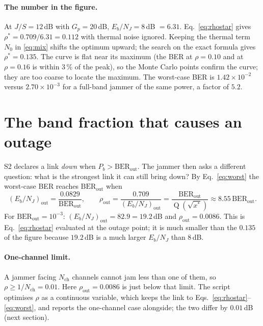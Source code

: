 \documentclass[11pt,a4paper]{article}
\newcommand{\Q}{\operatorname{Q}}
\newcommand{\EbNJ}{E_b/N_J}
\begin{document}
\paragraph{The number in the figure.}
At $J/S = 12$\,dB with $G_p=20$\,dB, $\EbNJ = 8$\,dB $=6.31$. Eq.~\eqref{eq:rhostar}
gives $\rho^\ast = 0.709/6.31 = 0.112$ with thermal noise ignored. Keeping the
thermal term $N_0$ in \eqref{eq:mix} shifts the optimum upward; the search on
the exact formula gives $\rho^\ast = 0.135$. The curve is flat near its maximum
(the BER at $\rho=0.10$ and at $\rho=0.16$ is within 3\,\% of the peak), so the
Monte Carlo points confirm the curve; they are too coarse to locate the
maximum. The worst-case BER is
$1.42\times10^{-2}$ versus $2.70\times10^{-3}$ for a full-band jammer of the same
power, a factor of $5.2$.

\section{The band fraction that causes an outage}

S2 declares a link \emph{down} when $P_b > \mathrm{BER}_{\mathrm{out}}$. The
jammer then asks a different question: what is the strongest link it can
still bring down? By
Eq.~\eqref{eq:worst} the worst-case BER reaches $\mathrm{BER}_{\mathrm{out}}$ when
\begin{equation}
  \left(\EbNJ\right)_{\mathrm{out}} = \frac{0.0829}{\mathrm{BER}_{\mathrm{out}}},
  \qquad
  \rho_{\mathrm{out}} = \frac{0.709}{(\EbNJ)_{\mathrm{out}}}
  = \frac{\mathrm{BER}_{\mathrm{out}}}{\Q(\sqrt{x^\ast})} \approx 8.55\,\mathrm{BER}_{\mathrm{out}} .
  \label{eq:rhoout}
\end{equation}
For $\mathrm{BER}_{\mathrm{out}}=10^{-3}$: $(\EbNJ)_{\mathrm{out}} = 82.9 = 19.2$\,dB and
$\rho_{\mathrm{out}} = 0.0086$. This is Eq.~\eqref{eq:rhostar} evaluated at the
outage point; it is much smaller than the $0.135$ of the figure because
$19.2$\,dB is a much larger $\EbNJ$ than $8$\,dB.

\paragraph{One-channel limit.}
A jammer facing $N_{\mathrm{ch}}$ channels cannot jam less than one of them, so
$\rho\ge 1/N_{\mathrm{ch}} = 0.01$. Here $\rho_{\mathrm{out}}=0.0086$ is just below
that limit. The script optimises $\rho$ as a continuous variable, which keeps
the link to Eqs.~\eqref{eq:rhostar}--\eqref{eq:worst}, and reports the
one-channel case alongside; the two differ by $0.01$\,dB (next section).
\end{document}
